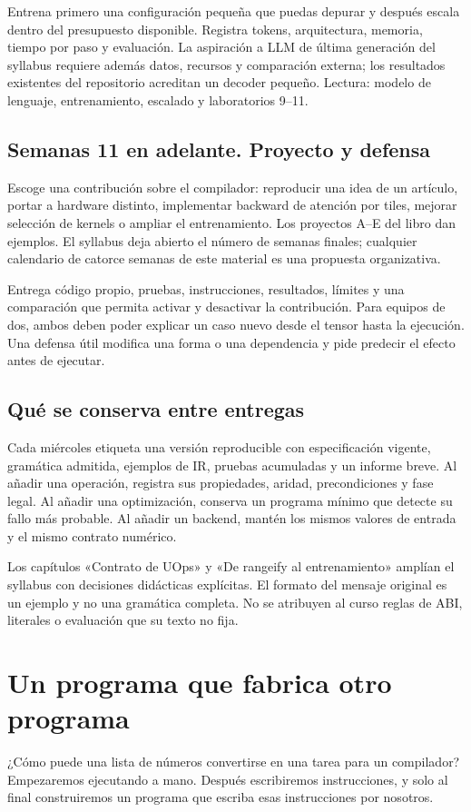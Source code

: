 \documentclass[12pt,a4paper,oneside]{report}
\begin{document}
Entrena primero una configuración pequeña que puedas depurar y después escala dentro del presupuesto disponible. Registra tokens, arquitectura, memoria, tiempo por paso y evaluación. La aspiración a LLM de última generación del syllabus requiere además datos, recursos y comparación externa; los resultados existentes del repositorio acreditan un decoder pequeño. Lectura: modelo de lenguaje, entrenamiento, escalado y laboratorios 9--11.

\section{Semanas 11 en adelante. Proyecto y defensa}
Escoge una contribución sobre el compilador: reproducir una idea de un artículo, portar a hardware distinto, implementar backward de atención por tiles, mejorar selección de kernels o ampliar el entrenamiento. Los proyectos A--E del libro dan ejemplos. El syllabus deja abierto el número de semanas finales; cualquier calendario de catorce semanas de este material es una propuesta organizativa.

Entrega código propio, pruebas, instrucciones, resultados, límites y una comparación que permita activar y desactivar la contribución. Para equipos de dos, ambos deben poder explicar un caso nuevo desde el tensor hasta la ejecución. Una defensa útil modifica una forma o una dependencia y pide predecir el efecto antes de ejecutar.

\section{Qué se conserva entre entregas}
Cada miércoles etiqueta una versión reproducible con especificación vigente, gramática admitida, ejemplos de IR, pruebas acumuladas y un informe breve. Al añadir una operación, registra sus propiedades, aridad, precondiciones y fase legal. Al añadir una optimización, conserva un programa mínimo que detecte su fallo más probable. Al añadir un backend, mantén los mismos valores de entrada y el mismo contrato numérico.

Los capítulos «Contrato de UOps» y «De rangeify al entrenamiento» amplían el syllabus con decisiones didácticas explícitas. El formato del mensaje original es un ejemplo y no una gramática completa. No se atribuyen al curso reglas de ABI, literales o evaluación que su texto no fija.


\chapter{Un programa que fabrica otro programa}
\label{ch:programa}
\begin{idea}
¿Cómo puede una lista de números convertirse en una tarea para un compilador? Empezaremos ejecutando a mano. Después escribiremos instrucciones, y solo al final construiremos un programa que escriba esas instrucciones por nosotros.

\end{idea}
\end{document}
